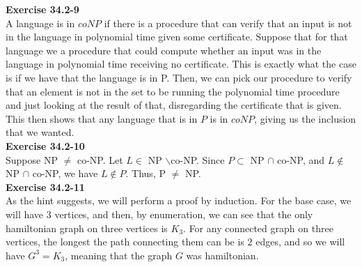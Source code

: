 \documentclass{article}
\begin{document}
\noindent\textbf{Exercise 34.2-9}\\

A language is in $coNP$ if there is a procedure that can verify that an input is not in the language in polynomial time given some certificate. Suppose that for that language we a procedure that could compute whether an input was in the language in polynomial time receiving no certificate. This is exactly what the case is if we have that the language is in P. Then, we can pick our procedure to verify that an element is not in the set to be running the polynomial time procedure and just looking at the result of that, disregarding the certificate that is given. This then shows that any language that is in $P$ is in $coNP$, giving us the inclusion that we wanted.\\

\noindent\textbf{Exercise 34.2-10}\\

Suppose NP $\neq$ co-NP.  Let $L \in$ NP $\backslash$co-NP.  Since $P \subset $ NP $\cap$ co-NP, and $L \notin $ NP $ \cap $ co-NP, we have $L \notin P$.  Thus, P $\neq$ NP.\\

\noindent\textbf{Exercise 34.2-11}\\

As the hint suggests, we will perform a proof by induction. For the base case, we will have $3$ vertices, and then, by enumeration, we can see that the only hamiltonian graph on three vertices is $K_3$. For any connected graph on three vertices, the longest the path connecting them can be is $2$ edges, and so we will have $G^3 = K_3$, meaning that the graph $G$ was hamiltonian.
\end{document}
